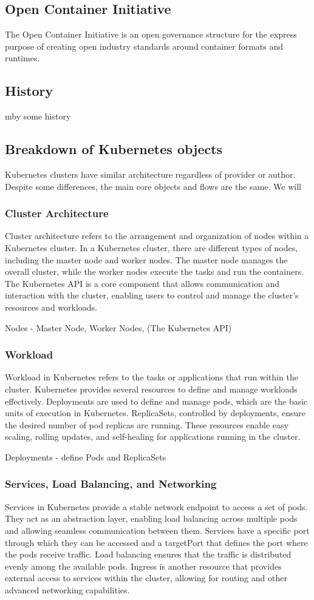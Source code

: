 \documentclass{article}
\begin{document}
\subsection{Open Container Initiative}
The Open Container Initiative is an open governance structure for the express purpose of creating open industry standards around container formats and runtimes.
\subsection{History}
mby some history
\subsection{Breakdown of Kubernetes objects}
Kubernetes clusters have similar architecture regardless of provider or author. Despite some differences, the main core objects and flows are the same. We will  
\subsubsection*{Cluster Architecture}
Cluster architecture refers to the arrangement and organization of nodes within a Kubernetes cluster. In a Kubernetes cluster, there are different types of nodes, including the master node and worker nodes. The master node manages the overall cluster, while the worker nodes execute the tasks and run the containers. The Kubernetes API is a core component that allows communication and interaction with the cluster, enabling users to control and manage the cluster's resources and workloads.

Nodes - Master Node, Worker Nodes, (The Kubernetes API)
\subsubsection*{Workload}
Workload in Kubernetes refers to the tasks or applications that run within the cluster. Kubernetes provides several resources to define and manage workloads effectively. Deployments are used to define and manage pods, which are the basic units of execution in Kubernetes. ReplicaSets, controlled by deployments, ensure the desired number of pod replicas are running. These resources enable easy scaling, rolling updates, and self-healing for applications running in the cluster.


Deployments - define Pods and ReplicaSets
\subsubsection*{Services, Load Balancing, and Networking}
Services in Kubernetes provide a stable network endpoint to access a set of pods. They act as an abstraction layer, enabling load balancing across multiple pods and allowing seamless communication between them. Services have a specific port through which they can be accessed and a targetPort that defines the port where the pods receive traffic. Load balancing ensures that the traffic is distributed evenly among the available pods. Ingress is another resource that provides external access to services within the cluster, allowing for routing and other advanced networking capabilities.
\end{document}
